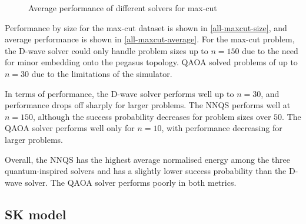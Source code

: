 \begin{figure}[!htbp]
    \centering
    \hfill
    \caption{Average performance of different solvers for max-cut}
    \label{all-maxcut-average}
\end{figure}

Performance by size for the max-cut dataset is shown in \autoref{all-maxcut-size}, and average performance is shown in \autoref{all-maxcut-average}. For the max-cut problem, the D-wave solver could only handle problem sizes up to $n=150$ due to the need for minor embedding onto the pegasus topology. QAOA solved problems of up to $n=30$ due to the limitations of the simulator.

In terms of performance, the D-wave solver performs well up to $n=30$, and performance drops off sharply for larger problems. The NNQS performs well at $n=150$, although the success probability decreases for problem sizes over $50$. The QAOA solver performs well only for $n=10$, with performance decreasing for larger problems.

Overall, the NNQS has the highest average normalised energy among the three quantum-inspired solvers and has a slightly lower success probability than the D-wave solver. The QAOA solver performs poorly in both metrics.

\subsection{SK model}

